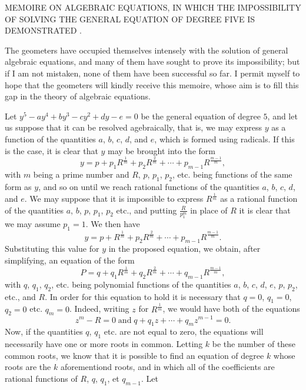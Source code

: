 \documentclass[12pt]{article}
\begin{document}
\begin{center}
MEMOIRE ON ALGEBRAIC EQUATIONS, IN WHICH THE IMPOSSIBILITY OF SOLVING THE GENERAL EQUATION OF DEGREE FIVE IS DEMONSTRATED .
\end{center}

The geometers have occupied themselves intensely with the solution of general algebraic equations, and many of them have sought to prove its impossibility; but if I am not mistaken, none of them have been successful so far.  I permit myself to hope that the geometers will kindly receive this memoire, whose aim is to fill this gap in the theory of algebraic equations. 

Let $y^5 - ay^4 + by^3 - cy^2 + dy - e = 0$ be the general equation of degree $5$, and let us suppose that it can be resolved agebraically, that is, we may express $y$ as a function of the quantities $a$, $b$, $c$, $d$, and $e$, which is formed using radicals.  If this is the case, it is clear that $y$ may be brought into the form
\[ y = p + p_1R^{\frac{1}{m}} + p_2 R^{\frac{2}{m}} + \cdots + p_{m-1}R^{\frac{m-1}{m}}, \]
with $m$ being a prime number and $R$, $p$, $p_1$, $p_2$, etc. being functions of the same form as $y$, and so on until we reach rational functions of the quantities $a$, $b$, $c$, $d$, and $e$.  We may suppose that it is impossible to express $R^{\frac{1}{m}}$ as a rational function of the quantities $a$, $b$, $p$, $p_1$, $p_2$ etc., and putting $\frac{R}{p_1^m}$ in place of $R$ it is clear that we may assume $p_1 = 1$. We then have
\[ y = p + R^{\frac{1}{m}} + p_2 R^{\frac{2}{m}} + \cdots + p_{m-1}R^{\frac{m-1}{m}}. \]
Substituting this value for $y$ in the proposed equation, we obtain, after simplifying, an equation of the form
\[ P = q + q_1R^{\frac{1}{m}} + q_2 R^{\frac{2}{m}} + \cdots + q_{m-1}R^{\frac{m-1}{m}}, \]
with $q$, $q_1$, $q_2$, etc. being polynomial functions of the quantities $a$, $b$, $c$, $d$, $e$, $p$, $p_2$, etc., and $R$.  In order for this equation to hold it is necessary that $q = 0$, $q_1=0$, $q_2=0$ etc. $q_m = 0$.  Indeed, writing $z$ for $R^{\frac{1}{m}}$, we would have both of the equations  
\[ z^m - R = 0 \; \mathrm{and} \; q + q_1z + \cdots + q_mz^{m-1} = 0.\]
Now, if the quantities $q$, $q_1$ etc. are not equal to zero, the equations will necessarily have one or more roots in common.  Letting $k$ be the number of these common roots, we know that it is possible to find an equation of degree $k$ whose roots are the $k$ aforementiond roots, and in which all of the coefficients are rational functions of $R$, $q$, $q_1$, et $q_{m-1}$. Let 
\end{document}
